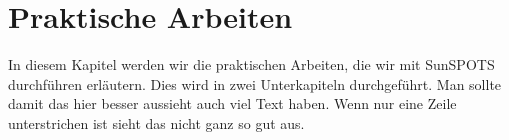 \chapter{Praktische Arbeiten}\label{c:PraktischeArbeiten}

In diesem Kapitel werden wir die praktischen Arbeiten, die wir mit SunSPOTS durchführen erläutern. Dies wird in zwei Unterkapiteln durchgeführt. Man sollte damit das hier besser aussieht auch viel Text haben. Wenn nur eine Zeile unterstrichen ist sieht das nicht ganz so gut aus.




